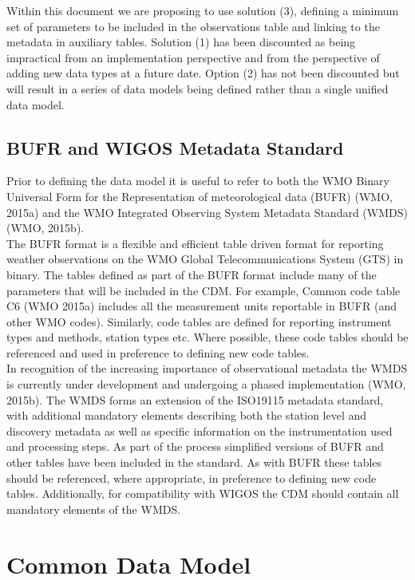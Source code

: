 \documentclass[a4paper]{article}
\begin{document}
Within this document we are proposing to use solution (3), defining a minimum set of parameters to be included in the observations table and linking to the metadata in auxiliary tables. Solution (1) has been discounted as being impractical from an implementation perspective and from the perspective of adding new data types at a future date. Option (2) has not been discounted but will result in a series of data models being defined rather than a single unified data model.\\

% 

\subsection {BUFR and WIGOS Metadata Standard}
Prior to defining the data model it is useful to refer to both the WMO Binary Universal Form for the Representation of meteorological data (BUFR) (WMO, 2015a) and the WMO Integrated Observing System Metadata Standard (WMDS) (WMO, 2015b). \\

The BUFR format is a flexible and efficient table driven format for reporting weather observations on the WMO Global Telecommunications System (GTS) in binary. The tables defined as part of the BUFR format include many of the parameters that will be included in the CDM. For example, Common code table C6 (WMO 2015a) includes all the measurement units reportable in BUFR (and other WMO codes). Similarly, code tables are defined for reporting instrument types and methods, station types etc. Where possible, these code tables should be referenced and used in preference to defining new code tables.\\

In recognition of the increasing importance of observational metadata the WMDS is currently under development and undergoing a phased implementation (WMO, 2015b). The WMDS forms an extension of the ISO19115 metadata standard, with additional mandatory elements describing both the station level and discovery metadata as well as specific information on the instrumentation used and processing steps. As part of the process simplified versions of BUFR and other tables have been included in the standard. As with BUFR these tables should be referenced, where appropriate, in preference to defining new code tables. Additionally, for compatibility with WIGOS the CDM should contain all mandatory elements of the WMDS. 

\section {Common Data Model}
\end{document}
